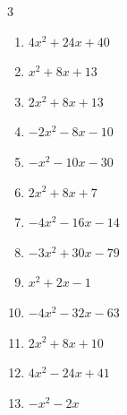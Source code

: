 \begin{multicols}{3}
\begin{enumerate}

  \item $4x^{2}+24x+40$


  \item $x^{2}+8x+13$


  \item $2x^{2}+8x+13$


  \item $-2x^{2}-8x-10$


  \item $-x^{2}-10x-30$


  \item $2x^{2}+8x+7$


  \item $-4x^{2}-16x-14$


  \item $-3x^{2}+30x-79$


  \item $x^{2}+2x-1$


\columnbreak %

  \item $-4x^{2}-32x-63$


  \item $2x^{2}+8x+10$


  \item $4x^{2}-24x+41$


  \item $-x^{2}-2x$



\end{enumerate}
\end{multicols}

